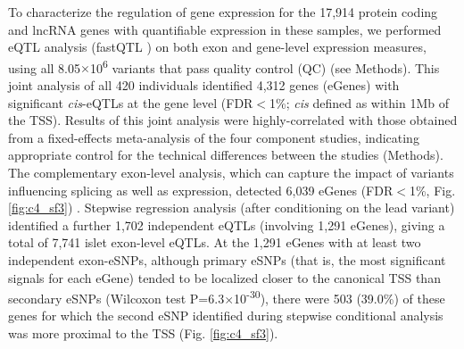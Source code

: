 To characterize the regulation of gene expression for the 17,914 protein coding and \ac{lncRNA} genes with quantifiable expression in these samples, we performed eQTL analysis (fastQTL \cite{ongenFastEfficientQTL2016}) on both exon and gene-level expression measures, using all 8.05$\times$10\textsuperscript{6} variants that pass quality control (QC) (see Methods). This joint analysis of all 420 individuals identified 4,312 genes (eGenes) with significant \textit{cis}-eQTLs at the gene level (FDR$<$1\%; \textit{cis} defined as within 1Mb of the \ac{TSS}). Results of this joint analysis were highly-correlated with those obtained from a fixed-effects meta-analysis of the four component studies, indicating appropriate control for the technical differences between the studies (Methods). The complementary exon-level analysis, which can capture the impact of variants influencing splicing as well as expression, detected 6,039 eGenes (FDR$<$1\%, Fig. \ref{fig:c4_sf3}) \cite{montgomeryTranscriptomeGeneticsUsing2010, lappalainenTranscriptomeGenomeSequencing2013}. Stepwise regression analysis (after conditioning on the lead variant) identified a further 1,702 independent eQTLs (involving 1,291 eGenes), giving a total of 7,741 islet exon-level eQTLs. At the 1,291 eGenes with at least two independent exon-eSNPs, although primary eSNPs (that is, the most significant signals for each eGene) tended to be localized closer to the canonical TSS than secondary eSNPs (Wilcoxon test P=6.3$\times$10\textsuperscript{-30}), there were 503 (39.0\%) of these genes for which the second eSNP identified during stepwise conditional analysis was more proximal to the TSS (Fig. \ref{fig:c4_sf3}).

